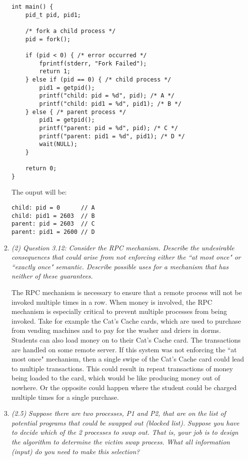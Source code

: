\documentclass[letterpaper,11pt]{article}
\begin{document}
\begin{enumerate}
\begin{verbatim}
int main() {
    pid_t pid, pid1;
    
    /* fork a child process */
    pid = fork();
    
    if (pid < 0) { /* error occurred */
        fprintf(stderr, "Fork Failed");
        return 1;
    } else if (pid == 0) { /* child process */
        pid1 = getpid();
        printf("child: pid = %d", pid); /* A */
        printf("child: pid1 = %d", pid1); /* B */
    } else { /* parent process */
        pid1 = getpid();
        printf("parent: pid = %d", pid); /* C */
        printf("parent: pid1 = %d", pid1); /* D */
        wait(NULL);
    }
    
    return 0;
}
\end{verbatim}
The ouput will be:
\begin{verbatim}
child: pid = 0      // A
child: pid1 = 2603  // B
parent: pid = 2603  // C
parent: pid1 = 2600 // D
\end{verbatim}
\item \emph{(2) Question 3.12: Consider the RPC mechanism. Describe the undesirable consequences that could arise from not enforcing either the ``at most once" or ``exactly once" semantic. Describe possible uses for a mechanism that has neither of these guarantees.}

The RPC mechanism is necessary to ensure that a remote process will not be invoked multiple times in a row.  When money is involved, the RPC mechanism is especially critical to prevent multiple processes from being invoked.  Take for example the Cat's Cache cards, which are used to purchase from vending machines and to pay for the washer and driers in dorms.  Students can also load money on to their Cat's Cache card.  The transactions are handled on some remote server.  If this system was not enforcing the ``at most once" mechanism, then a single swipe of the Cat's Cache card could lead to multiple transactions.  This could result in repeat transactions of money being loaded to the card, which would be like producing money out of nowhere.  Or the opposite could happen where the student could be charged multiple times for a single purchase.
\item \emph{(2.5) Suppose there are two processes, P1 and P2, that are on the list of potential programs that could be swapped out (blocked list). Suppose you have to decide which of the 2 processes to swap out. That is, your job is to design the algorithm to determine the victim swap process. What all information (input) do you need to make this selection?}


\end{enumerate}
\end{document}
